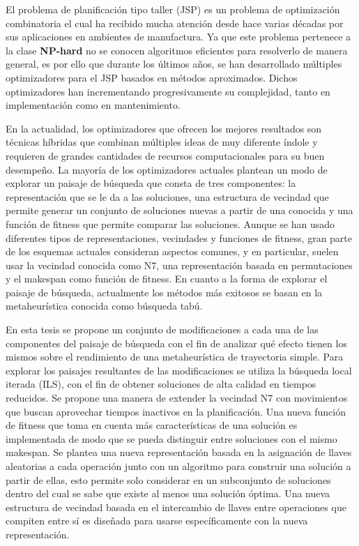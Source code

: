 El problema de planificación tipo taller (JSP) es un problema de optimización combinatoria el cual ha recibido mucha atención desde hace varias décadas por sus aplicaciones en ambientes de manufactura. Ya que este problema pertenece a la clase \textbf{NP-hard} no se conocen algoritmos eficientes para resolverlo de manera general, es por ello que durante los últimos años, se han desarrollado múltiples optimizadores para el JSP basados en métodos aproximados. Dichos optimizadores han incrementando progresivamente su complejidad, tanto en implementación como en mantenimiento.

%
 En la actualidad, los optimizadores que ofrecen los mejores resultados son técnicas híbridas que combinan múltiples ideas de muy diferente índole y requieren de grandes cantidades de recursos computacionales para su buen desempeño. La mayoría de los optimizadores actuales plantean un modo de explorar un paisaje de búsqueda que consta de tres componentes: la representación que se le da a las soluciones, una estructura de vecindad que permite generar un conjunto de soluciones nuevas a partir de una conocida y una función de fitness que permite comparar las soluciones. Aunque se han usado diferentes tipos de representaciones, vecindades y funciones de fitness, gran parte de los esquemas actuales consideran aspectos comunes, y en particular, suelen usar la vecindad conocida como N7, una representación basada en permutaciones y el makespan como función de fitness. En cuanto a la forma de explorar el paisaje de búsqueda, actualmente los métodos más exitosos se basan en la metaheurística conocida como búsqueda tabú.
%

 En esta tesis se propone un conjunto de modificaciones a cada una de las componentes del paisaje de búsqueda con el fin de analizar qué efecto tienen los mismos sobre el rendimiento de una metaheurística de trayectoria simple. Para explorar los paisajes resultantes de las modificaciones se utiliza la búsqueda local iterada (ILS), con el fin de obtener soluciones de alta calidad en tiempos reducidos.
%
Se propone una manera de extender la vecindad N7 con movimientos que buscan aprovechar tiempos inactivos en la planificación.
Una nueva función de fitness que toma en cuenta más características de una solución es implementada de modo que se pueda distinguir entre soluciones con el mismo makespan.
Se plantea una nueva representación basada en la asignación de llaves aleatorias a cada operación junto con un algoritmo para construir una solución a partir de ellas, esto permite solo considerar en un subconjunto de soluciones dentro del cual se sabe que existe al menos una solución óptima. Una nueva estructura de vecindad basada en el intercambio de llaves entre operaciones que compiten entre sí es diseñada para usarse específicamente con la nueva representación.

